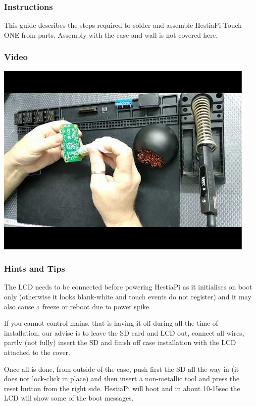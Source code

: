 \subsubsection{Instructions}
This guide describes the steps required to solder and assemble HestiaPi Touch ONE
from parts.  Assembly with the case and wall is not covered here.

\subsubsection{Video}
\href{https://www.youtube.com/watch?v=gRcRINqT31g}{\includegraphics[width=5.0in]{img/hestiapi_one_soldering.jpg}}

\subsubsection{Hints and Tips}
The LCD needs to be connected before powering HestiaPi as it initialises on
boot only (otherwise it looks blank-white and touch events do not register) and
it may also cause a freeze or reboot due to power spike.

If you cannot control mains, that is having it off during all the time of
installation, our advise is to leave the SD card and LCD out, connect all
wires, partly (not fully) insert the SD and finish off case installation with
the LCD attached to the cover.

Once all is done, from outside of the case, push first the SD all the way in
(it does not lock-click in place) and then insert a non-metallic tool and press
the reset button from the right side. HestiaPi will boot and in about 10-15sec
the LCD will show some of the boot messages.
